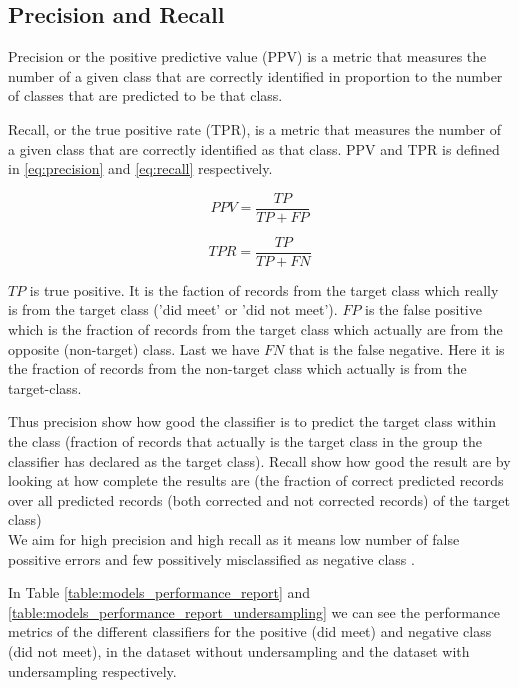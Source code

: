 \subsection{Precision and Recall}
Precision or the positive predictive value (PPV) is a metric that measures the number of a given class that are correctly identified in proportion to the number of classes that are predicted to be that class.

Recall, or the true positive rate (TPR), is a metric that measures the number of a given class that are correctly identified as that class. PPV and TPR is defined in \autoref{eq:precision} and \autoref{eq:recall} respectively. 

\begin{equation}
\label{eq:precision}
PPV=\frac{TP}{TP+FP}
\end{equation}

\begin{equation}
\label{eq:recall}
TPR=\frac{TP}{TP+FN}
\end{equation}

$TP$ is true positive. It is the faction of records from the target class which really is from the target class ('did meet' or 'did not meet'). $FP$ is the false positive which is the fraction of records from the target class which actually are from the opposite (non-target) class. Last we have $FN$ that is the false negative. Here it is the fraction of records from the non-target class which actually is from the target-class. 

Thus precision show how good the classifier is to predict the target class within the class (fraction of records that actually is the target class in the group the classifier has declared as the target class). Recall show how good the result are by looking at how complete the results are (the fraction of correct predicted records over all predicted records (both corrected and not corrected records) of the target class)\\

We aim for high precision and high recall as it means low number of false possitive errors and few possitively misclassified as negative class \cite{tan2006introduction}. 

In Table \ref{table:models_performance_report} and \ref{table:models_performance_report_undersampling} we can see the performance metrics of the different classifiers for the positive (did meet) and negative class (did not meet), in the dataset without undersampling and the dataset with undersampling respectively.

